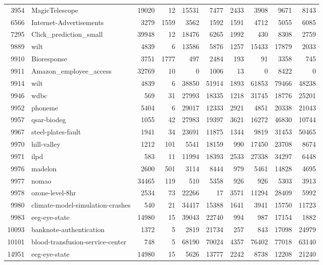 \documentclass{article}
\begin{document}
\begin{table}[ht]
\begin{tabular}{rlrrrrrrrr}
  3954 & MagicTelescope & 19020 & 12 & 15531 & 7477 & 2433 & 3908 & 9671 & 8143 \\ 
  6566 & Internet-Advertisements & 3279 & 1559 & 3562 & 1592 & 1591 & 4712 & 5055 & 6085 \\ 
  7295 & Click\_prediction\_small & 39948 & 12 & 18476 & 6265 & 1992 & 430 & 8308 & 2759 \\ 
  9889 & wilt & 4839 & 6 & 13586 & 5876 & 1257 & 15433 & 17879 & 2033 \\ 
  9910 & Bioresponse & 3751 & 1777 & 497 & 2484 & 193 & 91 & 3358 & 745 \\ 
  9911 & Amazon\_employee\_access & 32769 & 10 & 0 & 1006 & 13 & 0 & 8422 & 0 \\ 
  9914 & wilt & 4839 & 6 & 38850 & 51914 & 1893 & 61853 & 79466 & 48238 \\ 
  9946 & wdbc & 569 & 31 & 27993 & 18335 & 1218 & 31745 & 18776 & 25201 \\ 
  9952 & phoneme & 5404 & 6 & 29017 & 12333 & 2921 & 4851 & 20338 & 21043 \\ 
  9957 & qsar-biodeg & 1055 & 42 & 27983 & 19397 & 3621 & 16272 & 46830 & 10744 \\ 
  9967 & steel-plates-fault & 1941 & 34 & 23691 & 11875 & 1344 & 9819 & 31453 & 50465 \\ 
  9970 & hill-valley & 1212 & 101 & 5541 & 18159 & 990 & 17450 & 23708 & 8674 \\ 
  9971 & ilpd & 583 & 11 & 11994 & 18393 & 2533 & 27338 & 34297 & 6448 \\ 
  9976 & madelon & 2600 & 501 & 3114 & 8444 & 979 & 5461 & 14828 & 4695 \\ 
  9977 & nomao & 34465 & 119 & 510 & 5358 & 926 & 926 & 5303 & 3913 \\ 
  9978 & ozone-level-8hr & 2534 & 73 & 22266 & 17 & 3571 & 11294 & 28409 & 5992 \\ 
  9980 & climate-model-simulation-crashes & 540 & 21 & 34417 & 15388 & 1641 & 3941 & 15750 & 11723 \\ 
  9983 & eeg-eye-state & 14980 & 15 & 39043 & 22740 & 994 & 987 & 17154 & 1882 \\ 
  10093 & banknote-authentication & 1372 & 5 & 2819 & 21734 & 257 & 843 & 17098 & 24979 \\ 
  10101 & blood-transfusion-service-center & 748 & 5 & 68190 & 70024 & 4357 & 76402 & 77018 & 63140 \\ 
  14951 & eeg-eye-state & 14980 & 15 & 5626 & 13777 & 2242 & 8738 & 12208 & 21240 \\ 

\end{tabular}
\end{table}
\end{document}
